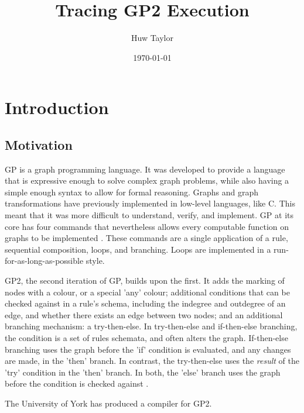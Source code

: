 \documentclass{UoYCSproject}
\author{Huw Taylor}
\title{Tracing GP2 Execution} %
\date{\today}
\begin{document}
\maketitle
\tableofcontents

\chapter{Introduction}
\section{Motivation}
GP is a graph programming language. It was developed to provide a language that is expressive enough to solve complex graph problems, while also having a simple enough syntax to allow for formal reasoning. Graphs and graph transformations have previously implemented in low-level languages, like C. This meant that it was more difficult to understand, verify, and implement\cite{gp_lang}. GP at its core has four commands that nevertheless allows every computable function on graphs to be implemented \cite{gp1}. These commands are a single application of a rule, sequential composition, loops, and branching. Loops are implemented in a run-for-as-long-as-possible style.

GP2, the second iteration of GP, builds upon the first. It adds the marking of nodes with a colour, or a special 'any' colour; additional conditions that can be checked against in a rule's schema, including the indegree and outdegree of an edge, and whether there exists an edge between two nodes; and an additional branching mechanism: a try-then-else. In try-then-else and if-then-else branching, the condition is a set of rules schemata, and often alters the graph. If-then-else branching uses the graph before the 'if' condition is evaluated, and any changes are made, in the 'then' branch. In contrast, the try-then-else uses the \emph{result} of the 'try' condition in the 'then' branch. In both, the 'else' branch uses the graph before the condition is checked against \cite{gp2_design}.

The University of York has produced a compiler for GP2. %
\end{document}
